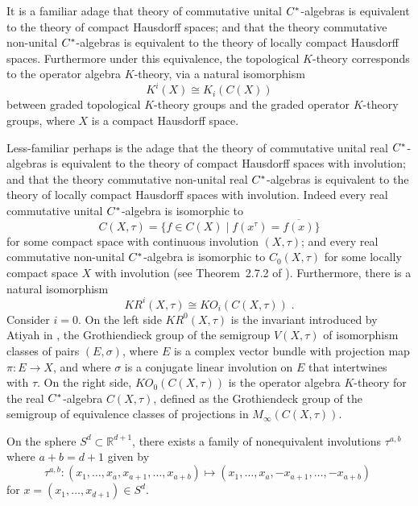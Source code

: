 \documentclass[12pt, reqno]{amsart}
\theoremstyle{definition}
\def\R{{\mathbb R}}
\begin{document}
It is a familiar adage that theory of commutative unital $C \sp *$-algebras is equivalent to the theory of compact Hausdorff spaces; and that the theory commutative non-unital $C \sp *$-algebras is equivalent to the theory of locally compact Hausdorff spaces.
Furthermore under this equivalence, the topological $K$-theory corresponds to the operator algebra $K$-theory, via a natural isomorphism 
$${K}^i(X) \cong K_i(C(X))$$
between graded topological $K$-theory groups and the graded operator $K$-theory groups, where $X$ is a compact Hausdorff space. 

Less-familiar perhaps is the adage that the theory of commutative unital real $C \sp *$-algebras is equivalent to the theory of compact Hausdorff spaces with involution; and that the theory commutative non-unital real $C \sp *$-algebras is equivalent to the theory of locally compact Hausdorff spaces with involution. Indeed every real commutative unital $C \sp *$-algebra is isomorphic to 
$$C(X, \tau) = \{ f \in C(X) \mid f(x^\tau) = \overline{f(x)} \}$$
for some compact space with continuous involution $(X, \tau)$; and every real commutative non-unital $C \sp *$-algebra is isomorphic to
$C_0(X, \tau)$ for some locally compact space $X$ with involution (see Theorem~2.7.2 of \cite{Li2003}).
Furthermore, there is a natural isomorphism
$$KR^i(X, \tau) \cong KO_i(C(X, \tau)) \; .$$ 
Consider $i = 0$. On the left side $KR^0(X, \tau)$ is the invariant introduced by Atiyah in \cite{atiyah66}, the Grothiendieck group of the semigroup $V(X, \tau)$ of isomorphism classes of pairs $(E, \sigma)$, where $E$ is a complex vector bundle with projection map $\pi \colon E \rightarrow X$, and where $\sigma$ is a conjugate linear involution on $E$ that intertwines with $\tau$.
On the right side, $KO_0(C(X, \tau))$ is the operator algebra $K$-theory for the real $C \sp *$-algebra $C(X, \tau)$, defined as the Grothiendeck group of the semigroup of equivalence classes of projections in $M_\infty(C(X, \tau))$.

On the sphere $S^d \subset \R^{d+1}$,
there exists a family of nonequivalent involutions $ \tau^{a,b}$ 
where $a+b = d+1$ given by
$$\tau^{a,b} \colon (x_1, \dots, x_a, x_{a+1}, \dots, x_{a+b}) \mapsto (x_1, \dots, x_a, -x_{a+1}, \dots, -x_{a+b}) \; $$
for $x = (x_1, \dots, x_{d+1}) \in S^d$. 
\end{document}
